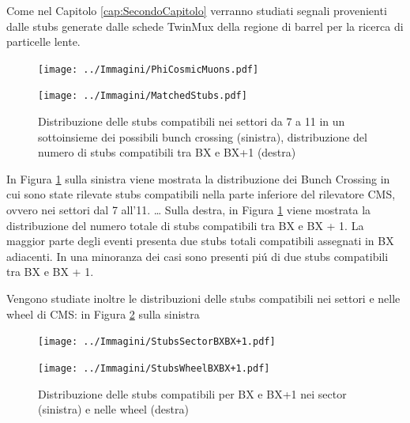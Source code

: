 Come nel Capitolo \ref{cap:SecondoCapitolo} verranno studiati segnali provenienti dalle stubs generate dalle schede TwinMux della regione di barrel per la ricerca di particelle lente.


\begin{figure}[t]
  \centering
  \begin{minipage}[b]{0.48\textwidth}
    \centering
    \texttt{[image: ../Immagini/PhiCosmicMuons.pdf]} 
    \end{minipage}
    \hfill 
    \begin{minipage}[b]{0.48\textwidth}
      \centering
      \texttt{[image: ../Immagini/MatchedStubs.pdf]} 
    \end{minipage}
    \caption{Distribuzione delle stubs compatibili nei settori da 7 a 11 in un sottoinsieme dei possibili bunch crossing (sinistra), distribuzione del numero di stubs compatibili tra BX e BX+1 (destra)}
  \label{fig:MatchedStubsRate}
\end{figure}

In Figura \ref{fig:MatchedStubsRate} sulla sinistra viene mostrata la distribuzione dei Bunch Crossing in cui sono state rilevate stubs compatibili nella parte inferiore del rilevatore CMS, ovvero nei settori dal 7 all'11. \dots %
Sulla destra, in Figura \ref{fig:MatchedStubsRate} viene mostrata la distribuzione del numero totale di stubs compatibili tra BX e BX + 1. La maggior parte degli eventi presenta due stubs totali compatibili assegnati in BX adiacenti. In una minoranza dei casi sono presenti piú di due stubs compatibili tra BX e BX + 1.

Vengono studiate inoltre le distribuzioni delle stubs compatibili nei settori e nelle wheel di CMS: in Figura \ref{fig:SectorWheelBXBX1} sulla sinistra




\begin{figure}[b]
  \centering
  \begin{minipage}[b]{0.48\textwidth}
    \centering
    \texttt{[image: ../Immagini/StubsSectorBXBX+1.pdf]} 
    \end{minipage}
    \hfill 
    \begin{minipage}[b]{0.48\textwidth}
      \centering
      \texttt{[image: ../Immagini/StubsWheelBXBX+1.pdf]} 
    \end{minipage}
    \caption{Distribuzione delle stubs compatibili per BX e BX+1 nei sector (sinistra) e nelle wheel (destra)}
  \label{fig:SectorWheelBXBX1}
\end{figure}

